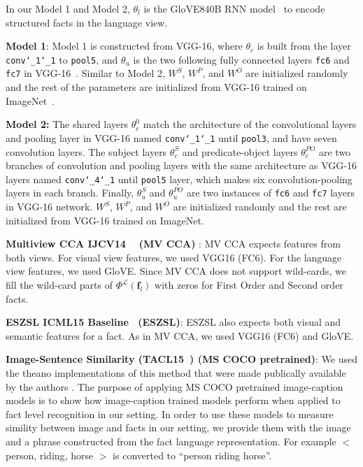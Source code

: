 \documentclass[runningheads]{llncs}
\begin{document}
In our Model 1 and Model 2, $\theta_l$ is the GloVE840B RNN model~\cite{pennington2014glove} to encode structured facts in the language view. %
\item{\textbf{Model 1}:} Model 1 is constructed from VGG-16, where  $\theta_c$ is built from the layer \texttt{conv\char`_1\char`_1} to \texttt{pool5}, and  $\theta_u$ is the two following fully connected layers \texttt{fc6} and  \texttt{fc7} in VGG-16~\cite{simonyan2014very}. Similar to Model 2,  $W^S$, $W^P$, and  $W^O$  are initialized randomly  and the rest of the parameters are initialized from VGG-16 trained on ImageNet~\cite{deng2009imagenet}.
\item \noindent\textbf{Model 2:} The shared layers $\theta_c^{0}$ match the architecture of the convolutional layers and pooling layer in VGG-16 named  \texttt{conv\char`_1\char`_1} until \texttt{pool3}, and have seven convolution layers. The subject layers $\theta_c^{S}$ and predicate-object layers $\theta_c^{{PO}}$ are two branches of convolution and pooling layers with the same architecture as VGG-16 layers  named  \texttt{conv\char`_4\char`_1} until \texttt{pool5} layer, which makes six convolution-pooling layers in each branch. Finally, $\theta_u^{S}$  and  $\theta_u^{{PO}}$ are two instances of \texttt{fc6} and \texttt{fc7} layers in VGG-16 network.
$W^S$, $W^P$, and  $W^O$  are initialized randomly and the rest are initialized from VGG-16 trained on ImageNet.
	\item \textbf{Multiview CCA IJCV14 ~\cite{gong2014multi} (MV CCA) }: MV CCA expects features from both views. For visual view features, we used VGG16 (FC6).
For the language view features, we used GloVE.
Since MV CCA does not support wild-cards, we fill the wild-card parts of $\Phi^\mathcal{L}(\mathbf{f}_l)$ with zeros for First Order and Second order facts.
	\item \textbf{ESZSL ICML15 Baseline~\cite{romera2015embarrassingly} (ESZSL)}: ESZSL also expects both visual and semantic features for a fact.
As in MV CCA,  we used VGG16 (FC6) and GloVE.
     \item \textbf{Image-Sentence Similarity (TACL15~\cite{kiros2014unifying}) (MS COCO pretrained)}: We used the theano implementations of this method that were made publically available by the authors \cite{tacl15_implementation}.
The purpose of applying MS COCO pretrained image-caption models is to show how image-caption trained models perform when applied to fact level recognition in our setting. In order to use these models to measure simility between image and facts in our setting, we provide them with the image and a phrase constructed from the fact language representation. For example $<$person, riding, horse $>$ is converted to ``person riding horse''.
\end{document}
